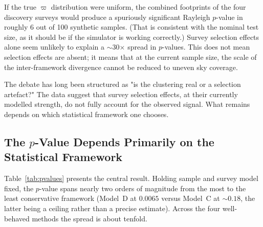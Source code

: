 \documentclass{aa}
\begin{document}
If the true $\varpi$ distribution were uniform, the combined footprints of the four discovery surveys would produce a spuriously significant Rayleigh $p$-value in roughly 6 out of 100 synthetic samples. (That is consistent with the nominal test size, as it should be if the simulator is working correctly.) Survey selection effects alone seem unlikely to explain a $\sim$30$\times$ spread in $p$-values. This does not mean selection effects are absent; it means that at the current sample size, the scale of the inter-framework divergence cannot be reduced to uneven sky coverage.

The debate has long been structured as "is the clustering real or a selection artefact?" The data suggest that survey selection effects, at their currently modelled strength, do not fully account for the observed signal. What remains depends on which statistical framework one chooses.

\subsection{The $p$-Value Depends Primarily on the Statistical Framework}

Table~\ref{tab:pvalues} presents the central result. Holding sample and survey model fixed, the $p$-value spans nearly two orders of magnitude from the most to the least conservative framework (Model~D at $0.0065$ versus Model~C at $\sim0.18$, the latter being a ceiling rather than a precise estimate). Across the four well-behaved methods the spread is about tenfold.
\end{document}

